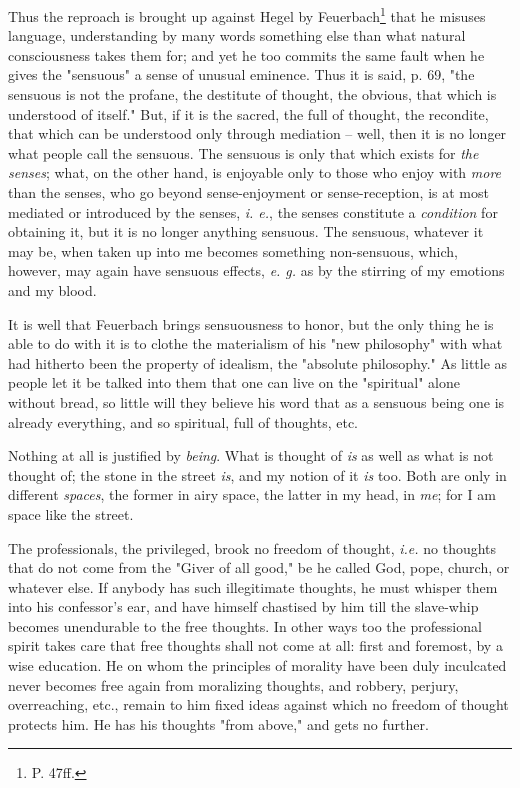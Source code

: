 Thus the reproach is brought up against Hegel by Feuerbach\footnote{P. 47ff.} 
that he misuses language, understanding by many words something else than what 
natural consciousness takes them for; and yet he too commits the same fault 
when he gives the "{}sensuous"{} a sense of unusual eminence. Thus it is said, 
p. 69, "{}the sensuous is not the profane, the destitute of thought, the 
obvious, that which is understood of itself."{} But, if it is the sacred, the 
full of thought, the recondite, that which can be understood only through 
mediation -- well, then it is no longer what people call the sensuous. The 
sensuous is only that which exists for \textit{the senses}; what, on the other 
hand, is enjoyable only to those who enjoy with \textit{more} than the senses, 
who go beyond sense-enjoyment or sense-reception, is at most mediated or 
introduced by the senses, \textit{i. e.}, the senses constitute a 
\textit{condition} for obtaining it, but it is no longer anything sensuous. 
The sensuous, whatever it may be, when taken up into me becomes something 
non-sensuous, which, however, may again have sensuous effects, \textit{e. g.} 
as by the stirring of my emotions and my blood.

It is well that Feuerbach brings sensuousness to honor, but the only thing he 
is able to do with it is to clothe the materialism of his "{}new philosophy"{} 
with what had hitherto been the property of idealism, the "{}absolute 
philosophy."{} As little as people let it be talked into them that one can 
live on the "{}spiritual"{} alone without bread, so little will they believe 
his word that as a sensuous being one is already everything, and so spiritual, 
full of thoughts, etc.

Nothing at all is justified by \textit{being}. What is thought of \textit{is} 
as well as what is not thought of; the stone in the street \textit{is}, and my 
notion of it \textit{is} too. Both are only in different \textit{spaces}, the 
former in airy space, the latter in my head, in \textit{me}; for I am space 
like the street.

The professionals, the privileged, brook no freedom of thought, \textit{i.e.} 
no thoughts that do not come from the "{}Giver of all good,"{} be he called 
God, pope, church, or whatever else. If anybody has such illegitimate 
thoughts, he must whisper them into his confessor's ear, and have himself 
chastised by him till the slave-whip becomes unendurable to the free thoughts. 
In other ways too the professional spirit takes care that free thoughts shall 
not come at all: first and foremost, by a wise education. He on whom the 
principles of morality have been duly inculcated never becomes free again from 
moralizing thoughts, and robbery, perjury, overreaching, etc., remain to him 
fixed ideas against which no freedom of thought protects him. He has his 
thoughts "{}from above,"{} and gets no further.

